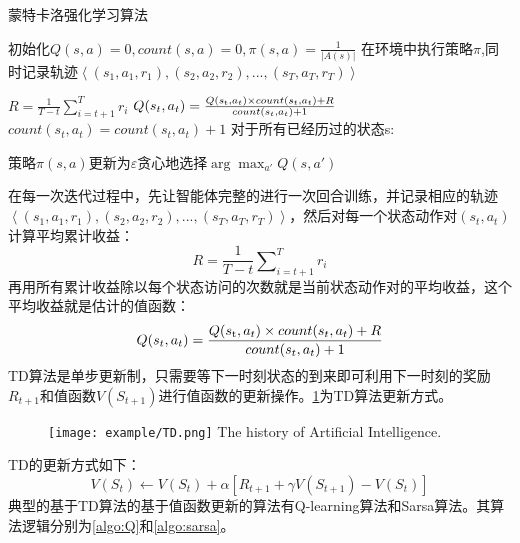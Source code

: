 \begin{algorithm}
	\caption{蒙特卡洛强化学习算法}
	\label{algo:MC}
	\begin{algorithmic}[1] %
		\State 初始化$Q(s,a) = 0,count(s,a) = 0,\pi (s,a) = \frac{1}{{|A(s)|}}$
		\State 在环境中执行策略$\pi$,同时记录轨迹$\left\langle {({s_1},{a_1},{r_1}),({s_2},{a_2},{r_2}),...,({s_T},{a_T},{r_T})} \right\rangle  $
		
		\State $R = \frac{1}{{T - t}}\sum\nolimits_{i = t + 1}^T {{r_i}} $
		\State $Q({s_t},{a_t}) = \frac{{Q({s_{\rm{t}}},{a_t}) \times count({s_t},{a_t}) + R}}{{count({s_t},{a_t}) + 1}} $
		\State $count({s_t},{a_t}) = count({s_t},{a_t}) + 1$
		\EndFor
		\State 对于所有已经历过的状态s:
		      
		      策略$\pi (s,a)$更新为$\varepsilon $贪心地选择$\arg {\max _{a'}}Q(s,a')$
		\EndFor
	\end{algorithmic}
\end{algorithm}
在每一次迭代过程中，先让智能体完整的进行一次回合训练，并记录相应的轨迹$\left\langle {({s_1},{a_1},{r_1}),({s_2},{a_2},{r_2}),...,({s_T},{a_T},{r_T})} \right\rangle  $，然后对每一个状态动作对$({s_t},{a_t}) $计算平均累计收益：
\begin{equation}
\label{eq:reward}
R = \frac{1}{{T - t}}\sum\nolimits_{i = t + 1}^T {{r_i}} 
\end{equation}
再用所有累计收益除以每个状态访问的次数就是当前状态动作对的平均收益，这个平均收益就是估计的值函数：
\begin{equation}
\label{eq:reward2}
Q({s_t},{a_t}) = \frac{{Q({s_{\rm{t}}},{a_t}) \times count({s_t},{a_t}) + R}}{{count({s_t},{a_t}) + 1}} 
\end{equation}
TD算法是单步更新制，只需要等下一时刻状态的到来即可利用下一时刻的奖励$ {R_{t + 1}}$和值函数$V({S_{t + 1}}) $进行值函数的更新操作。\ref{fig:6}为TD算法更新方式。
\begin{figure}[htpb]
	\centering
	\texttt{[image: example/TD.png]}
	{The history of Artificial Intelligence.}
	\label{fig:6}
\end{figure}
TD的更新方式如下：
\begin{equation}
\label{eq:td}
V({S_t}) \leftarrow V({S_t}) + \alpha [{R_{t + 1}} + \gamma V({S_{t + 1}}) - V({S_t})]
\end{equation}
典型的基于TD算法的基于值函数更新的算法有Q-learning算法和Sarsa算法。其算法逻辑分别为\ref{algo:Q}和\ref{algo:sarsa}。

